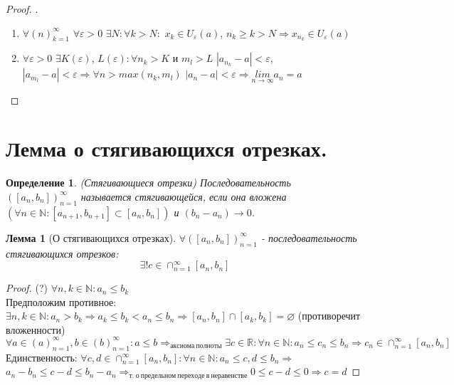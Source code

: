 \documentclass[11pt,a4paper,titlepage]{article}
\newtheorem*{definition}{Определение}
\newtheorem*{lemma}{Лемма}
\renewcommand{\lim}[2]{\underset{#1 \rightarrow #2}{lim}}
\newcommand{\limn}{\lim{n}{\infty}}
\renewcommand{\implies}{\Rightarrow}
\renewcommand{\emptyset}{\varnothing}
\renewcommand{\epsilon}{\varepsilon}
\newcommand{\R}{\mathbb{R}}
\newcommand{\N}{\mathbb{N}}
\begin{document}
    \begin{proof}
        .
        \begin{enumerate}

            \item $\forall (n)_{k=1}^\infty$ $\forall \epsilon > 0$ $ \exists N: \forall k > N:$ $x_k \in U_\epsilon(a)$, $n_k \geq k > N \Rightarrow x_{n_k} \in U_\epsilon(a)$

            \item $\forall \epsilon > 0$ $\exists K(\epsilon)$, $L(\epsilon):\forall n_k > K$ и $m_l > L$ $|a_{n_k} - a| < \epsilon$, $|a_{m_l} - a| < \epsilon \Rightarrow \forall n > max(n_k, m_l)$ $|a_n - a| < \epsilon \Rightarrow \limn a_n = a$ %

        \end{enumerate}
    \end{proof}


    \section{Лемма о стягивающихся отрезках.}

    \begin{definition}
        (Стягивающиеся отрезки)
        Последовательность $([a_n, b_n])_{n=1}^\infty$ называется стягивающейся, если она вложена $(\forall n \in \N: [a_{n+1}, b_{n+1}] \subset [a_n, b_n])$ и $(b_n - a_n) \to 0$.
    \end{definition}

    \begin{lemma}[О стягивающихся отрезках]
        $\forall ([a_n, b_n])_{n=1}^\infty$ - последовательность стягивающихся отрезков: \[\exists!c \in \cap_{n=1}^\infty[a_n, b_n]\]
    \end{lemma}

    \begin{proof}
        (?) $\forall n,k \in \N: a_n \leq b_k$\\
        Предположим противное: $\exists n,k \in \N: a_n > b_k \implies a_k \leq b_k < a_n \leq b_n \implies [a_n, b_n] \cap [a_k, b_k] = \emptyset$ (противоречит вложенности)\\
        $\forall a \in (a)_{n=1}^\infty, b \in (b)_{n=1}^\infty: a \leq b \implies_{аксиома\ полноты} \exists c \in \R: \forall n \in \N: a_n \leq c_n \leq b_n \implies c_n \in \cap_{n=1}^\infty[a_n, b_n]$\\

        Единственность: $\forall c, d \in \cap_{n=1}^\infty[a_n, b_n]: \forall n \in \N: a_n \leq c, d \leq b_n \implies$\\$ a_n-b_n \leq c-d  \leq b_n-a_n \implies_{т.\ о\ предельном\ переходе\ в\ неравенстве} 0 \leq c-d \leq 0 \implies c=d $

    \end{proof}
\end{document}
